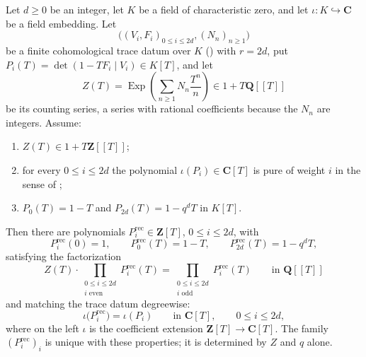 \begin{theorem}
\label{thm:zla-weil-factorization}
\leanok
Let $d\geq0$ be an integer, let $K$ be a field of characteristic zero, and
let $\iota:K\hookrightarrow\mathbf C$ be a field embedding.  Let
\[
  \bigl((V_i,F_i)_{0\leq i\leq2d},(N_n)_{n\geq1}\bigr)
\]
be a finite cohomological trace datum over $K$ ()
with $r=2d$, put $P_i(T)=\det(1-TF_i\mid V_i)\in K[T]$, and let
\[
  Z(T)=\operatorname{Exp}\left(\sum_{n\geq1}N_n\frac{T^n}{n}\right)
  \in1+T\mathbf Q[[T]]
\]
be its counting series, a series with rational coefficients because the $N_n$
are integers.  Assume:
\begin{enumerate}[label=\textup{(\roman*)}]
\item $Z(T)\in1+T\mathbf Z[[T]]$;
\item for every $0\leq i\leq2d$ the polynomial $\iota(P_i)\in\mathbf C[T]$ is
      pure of weight $i$ in the sense of ;
\item $P_0(T)=1-T$ and $P_{2d}(T)=1-q^dT$ in $K[T]$.
\end{enumerate}
Then there are polynomials
$P_i^{\mathrm{rec}}\in\mathbf Z[T]$, $0\leq i\leq2d$, with
\[
  P_i^{\mathrm{rec}}(0)=1,
  \qquad
  P_0^{\mathrm{rec}}(T)=1-T,
  \qquad
  P_{2d}^{\mathrm{rec}}(T)=1-q^dT,
\]
satisfying the factorization
\[
  Z(T)\cdot\prod_{\substack{0\leq i\leq2d\\ i\text{ even}}}P_i^{\mathrm{rec}}(T)
  =\prod_{\substack{0\leq i\leq2d\\ i\text{ odd}}}P_i^{\mathrm{rec}}(T)
  \qquad\text{in }\mathbf Q[[T]]
\]
and matching the trace datum degreewise:
\[
  \iota\bigl(P_i^{\mathrm{rec}}\bigr)=\iota(P_i)
  \qquad\text{in }\mathbf C[T],\qquad 0\leq i\leq2d,
\]
where on the left $\iota$ is the coefficient extension
$\mathbf Z[T]\to\mathbf C[T]$.  The family $(P_i^{\mathrm{rec}})_i$ is unique
with these properties; it is determined by $Z$ and $q$ alone.
\end{theorem}
